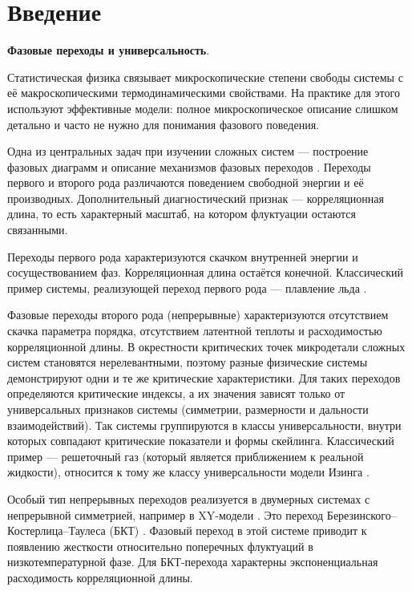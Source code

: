 \chapter*{ Введение }
\label{ch:ch0}

\textbf{Фазовые переходы и универсальность}.

Статистическая физика связывает микроскопические степени свободы системы с её макроскопическими термодинамическими свойствами. 
На практике для этого используют эффективные модели: полное микроскопическое описание слишком детально и часто не нужно для понимания фазового поведения.
 
 
Одна из центральных задач при изучении сложных систем --- построение фазовых диаграмм и описание механизмов фазовых переходов \cite{cardy1996scaling,stanley1971introduction}.  
Переходы первого и второго рода различаются поведением свободной энергии и её производных. Дополнительный диагностический признак --- корреляционная длина, то есть характерный масштаб, на котором флуктуации остаются связанными.

Переходы первого рода характеризуются скачком  внутренней энергии и сосуществованием фаз. Корреляционная длина остаётся конечной. Классический пример системы, реализующей переход первого рода --- плавление льда \cite{cardy1996scaling}.  

Фазовые переходы второго рода (непрерывные) характеризуются отсутствием  скачка параметра порядка, отсутствием латентной теплоты и расходимостью корреляционной длины. 
В окрестности критических точек микродетали сложных систем становятся нерелевантными, поэтому разные физические системы демонстрируют одни и те же критические характеристики.
 Для таких переходов определяются критические индексы, а их значения зависят только от универсальных признаков системы (симметрии, размерности и дальности взаимодействий). 
 Так системы группируются в классы универсальности, внутри которых совпадают критические показатели и формы скейлинга. 
 Классический пример --- решеточный газ (который является приближением к реальной жидкости),  относится к тому же классу универсальности модели Изинга \cite{PELISSETTO2002549}. 

 
 

Особый тип непрерывных переходов реализуется в двумерных системах с непрерывной симметрией, например в XY-модели  \cite{kosterlitz1973ordering,Berezinskii1970ZhETF,Berezinskii1970ZhETF,Berezinskii1971ZhETF}. 
Это переход Березинского–Костерлица–Таулеса (БКТ)
\cite{pokrov}. Фазовый переход в этой системе приводит к появлению жесткости относительно поперечных флуктуаций в низкотемпературной фазе. 
Для БКТ-перехода характерны экспоненциальная расходимость корреляционной длины. 

